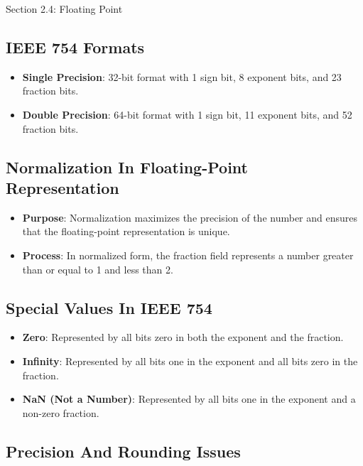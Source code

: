 \begin{notes}{Section 2.4: Floating Point}
    \subsection*{IEEE 754 Formats}
    
    \begin{itemize}
        \item \textbf{Single Precision}: 32-bit format with 1 sign bit, 8 exponent bits, and 23 fraction bits.
        \item \textbf{Double Precision}: 64-bit format with 1 sign bit, 11 exponent bits, and 52 fraction bits.
    \end{itemize}
    
    \subsection*{Normalization In Floating-Point Representation}
    
    \begin{itemize}
        \item \textbf{Purpose}: Normalization maximizes the precision of the number and ensures that the floating-point representation is unique.
        \item \textbf{Process}: In normalized form, the fraction field represents a number greater than or equal to 1 and less than 2.
    \end{itemize}
    
    \subsection*{Special Values In IEEE 754}
    
    \begin{itemize}
        \item \textbf{Zero}: Represented by all bits zero in both the exponent and the fraction.
        \item \textbf{Infinity}: Represented by all bits one in the exponent and all bits zero in the fraction.
        \item \textbf{NaN (Not a Number)}: Represented by all bits one in the exponent and a non-zero fraction.
    \end{itemize}
    
    \subsection*{Precision And Rounding Issues}
    

\end{notes}

